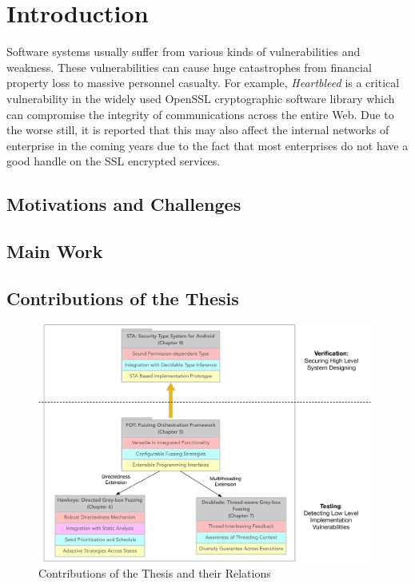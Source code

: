 
\chapter{Introduction} \label{ch:introduction}

Software systems usually suffer from various kinds of vulnerabilities and weakness. These vulnerabilities can cause huge catastrophes from financial property loss to massive personnel casualty. For example, \emph{Heartbleed} is a critical vulnerability in the widely used OpenSSL cryptographic software library which can compromise the integrity of communications across the entire Web. Due to the  worse still, it is reported that this may also affect the internal networks of enterprise in the coming years due to the fact that most enterprises do not have a good handle on the SSL encrypted services. 


\section{Motivations and Challenges}

\section{Main Work}

\section{Contributions of the Thesis}

\begin{figure}[ht]
	\begin{center}
		\includegraphics[width=0.98\textwidth]{res/contributions}
		\caption{Contributions of the Thesis and their Relations}
		\label{fig:works}
	\end{center}
\end{figure}


